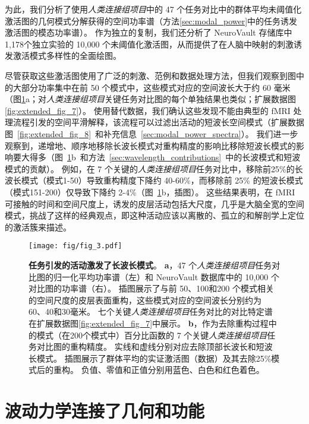 \documentclass[lang=cn,a4paper,newtx]{elegantpaper}
\begin{document}
为此，我们分析了使用\textit{人类连接组项目}中的 47 个任务对比中的群体平均未阈值化激活图的几何模式分解获得的空间功率谱（方法\ref{sec:modal_power}中的任务诱发激活图的模态功率谱）。
作为独立的复制，我们还分析了 NeuroVault 存储库中1,178个独立实验的 10,000 个未阈值化激活图，从而提供了在人脑中映射的刺激诱发激活模式多样性的全面绘图。


尽管获取这些激活图使用了广泛的刺激、范例和数据处理方法，但我们观察到图中的大部分功率集中在前 50 个模式中，这些模式对应的空间波长大于约 60 毫米（图\ref{fig:3}a；对\textit{人类连接组项目}关键任务对比图的每个单独结果也类似；扩展数据图\ref{fig:extended_fig_7}）。
使用替代数据，我们确认这些发现不能由典型的 fMRI 处理流程引发的空间平滑解释，该流程可以过滤出活动的短波长空间模式（扩展数据图~\ref{fig:extended_fig_8}~和补充信息~\ref{sec:modal_power_spectra}）。
我们进一步观察到，递增地、顺序地移除长波长模式对重构精度的影响比移除短波长模式的影响要大得多（图~\ref{fig:3}b~和方法~\ref{sec:wavelength_contributions}~中的长波模式和短波模式的贡献）。
例如，在 7 个关键的\textit{人类连接组项目}任务对比中，移除前25\%的长波长模式（模式1-50）导致重构精度下降约 40-60\%，而移除前 25\% 的短波长模式（模式151-200）仅导致下降约 2-4\%（图~\ref{fig:3}b，插图）。
这些结果表明，在 fMRI 可接触的时间和空间尺度上，诱发的皮层活动包括大尺度，几乎是大脑全宽的空间模式，挑战了这样的经典观点，即这种活动应该以离散的、孤立的和解剖学上定位的激活簇来描述。


\begin{figure}[!htb]
	\centering
	\texttt{[image: fig/fig\_3.pdf]}
	\caption{\textbf{任务引发的活动激发了长波长模式}。
	\textbf{a}，47 个\textit{人类连接组项目}任务对比图的归一化平均功率谱（左）和 NeuroVault 数据库中的 10,000 个对比图的功率谱（右）。
	插图展示了与前 50、100和200 个模式相关的空间尺度的皮层表面重构，这些模式对应的空间波长分别约为 60、40和30毫米。
	七个关键\textit{人类连接组项目}任务对比的对比特定谱在扩展数据图\ref{fig:extended_fig_7}中展示。 
	\textbf{b}，作为去除重构过程中的模式（在200个模式中）百分比函数的 7 个关键\textit{人类连接组项目}任务对比图的重构精度。
	实线和虚线分别对应去除顶部长波长和短波长模式。
	插图展示了群体平均的实证激活图（数据）及其去除25\%模式后的重构。
	负值、零值和正值分别用蓝色、白色和红色着色。
	} \label{fig:3}
\end{figure}



\section{波动力学连接了几何和功能}
\end{document}
